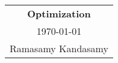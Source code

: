 



\raggedright
\footnotesize
\begin{multicols*}{3}
\setlength{\premulticols}{1pt}
\setlength{\postmulticols}{1pt}
\setlength{\multicolsep}{1pt}
\setlength{\columnsep}{2pt}

\begin{center}
\begin{tabular}{c}
\LARGE{\textbf{Optimization}}\\
\today\\
Ramasamy Kandasamy\\
\end{tabular}
\end{center}



\end{multicols*}
